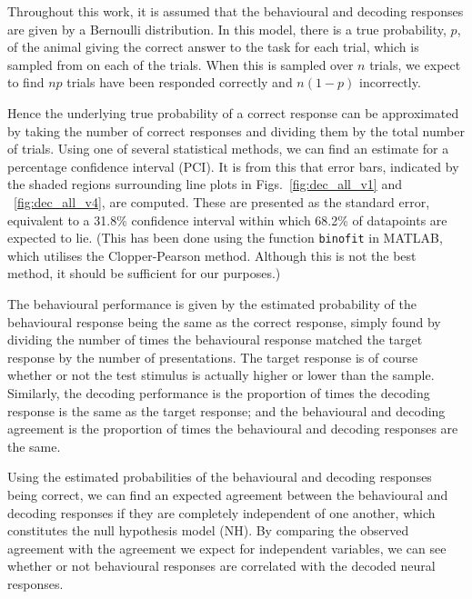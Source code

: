 Throughout this work, it is assumed that the behavioural and decoding responses are given by a Bernoulli distribution. In this model, there is a true probability, $p$, of the animal giving the correct answer to the task for each trial, which is sampled from on each of the trials. When this is sampled over $n$ trials, we expect to find $np$ trials have been responded correctly and $n(1-p)$ incorrectly.

Hence the underlying true probability of a correct response can be approximated by taking the number of correct responses and dividing them by the total number of trials. Using one of several statistical methods, we can find an estimate for a percentage confidence interval (PCI).
It is from this that error bars, indicated by the shaded regions surrounding line plots in Figs.~\ref{fig:dec_all_v1} and ~\ref{fig:dec_all_v4}, are computed. These are presented as the standard error, equivalent to a 31.8\%  confidence interval within which 68.2\% of datapoints are expected to lie. (This has been done using the function \texttt{binofit} in MATLAB, which utilises the Clopper-Pearson method. Although this is not the best method, it should be sufficient for our purposes.)

The behavioural performance is given by the estimated probability of the behavioural response being the same as the correct response, simply found by dividing the number of times the behavioural response matched the target response by the number of presentations.
The target response is of course whether or not the test stimulus is actually higher or lower than the sample. Similarly, the decoding performance is the proportion of times the decoding response is the same as the target response; and the behavioural and decoding agreement is the proportion of times the behavioural and decoding responses are the same.

Using the estimated probabilities of the behavioural and decoding responses being correct, we can find an expected agreement between the behavioural and decoding responses if they are completely independent of one another, which constitutes the null hypothesis model (NH). By comparing the observed agreement with the agreement we expect for independent variables, we can see whether or not behavioural responses are correlated with the decoded neural responses.

